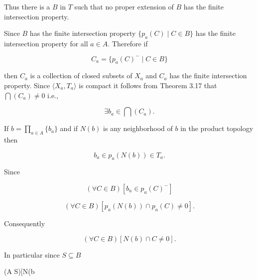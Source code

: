 Thus there is a $B$ in $T$ such that no proper extension of $B$ has the finite intersection property.

Since $B$ has the finite intersection property $\{p_a(C) \mid C \in B\}$ has the finite intersection property for all $a \in A$. Therefore if

$$C_a = \{p_a(C)^- \mid C \in B\}$$

then $C_a$ is a collection of closed subsets of $X_a$ and $C_a$ has the finite intersection property. Since $\langle X_a, T_a \rangle$ is compact it follows from Theorem 3.17 that $\bigcap (C_a) \neq 0$ i.e.,

$$\exists b_a \in \bigcap (C_a).$$

If $b = \prod_{a \in A} \{b_a\}$ and if $N(b)$ is any neighborhood of $b$ in the product topology then

$$b_a \in p_a(N(b)) \in T_a.$$

Since

$$(\forall C \in B)[b_a \in p_a(C)^-]$$

$$(\forall C \in B)[p_a(N(b)) \cap p_a(C) \neq 0].$$

Consequently

$$(\forall C \in B)[N(b) \cap C \neq 0].$$

In particular since $S \subseteq B$

$$(\forall A \in S)[N(b
